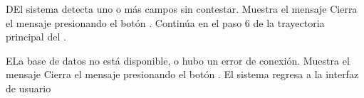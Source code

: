 \begin{UCtrayectoriaA}{D}{El sistema detecta uno o más campos sin contestar.}
	\UCpaso Muestra el mensaje 
	\UCpaso[\UCactor] Cierra el mensaje presionando el botón .
    \UCpaso Continúa en el paso 6 de la trayectoria principal del .
\end{UCtrayectoriaA}

\begin{UCtrayectoriaA}{E}{La base de datos no está disponible, o hubo un error de conexión.}
	\UCpaso Muestra el mensaje 
	\UCpaso[\UCactor] Cierra el mensaje presionando el botón .
	\UCpaso El sistema regresa a la interfaz de usuario 
\end{UCtrayectoriaA}